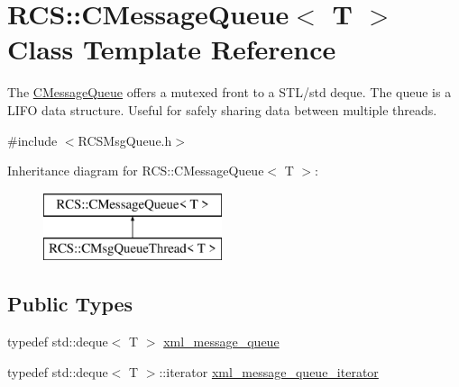 \hypertarget{classRCS_1_1CMessageQueue}{\section{R\-C\-S\-:\-:C\-Message\-Queue$<$ T $>$ Class Template Reference}
\label{classRCS_1_1CMessageQueue}
}


The \hyperlink{classRCS_1_1CMessageQueue}{C\-Message\-Queue} offers a mutexed front to a S\-T\-L/std deque. The queue is a L\-I\-F\-O data structure. Useful for safely sharing data between multiple threads.  




{\ttfamily \#include $<$R\-C\-S\-Msg\-Queue.\-h$>$}

Inheritance diagram for R\-C\-S\-:\-:C\-Message\-Queue$<$ T $>$\-:\begin{figure}[H]
\begin{center}
\leavevmode
\includegraphics[height=2.000000cm]{classRCS_1_1CMessageQueue}
\end{center}
\end{figure}
\subsection*{Public Types}
\begin{DoxyCompactItemize}
\item 
typedef std\-::deque$<$ T $>$ \hyperlink{classRCS_1_1CMessageQueue_a272ec6240c0ae616f66e71a033326e28}{xml\-\_\-message\-\_\-queue}
\item 
typedef std\-::deque$<$ T $>$\-::iterator \hyperlink{classRCS_1_1CMessageQueue_aa229add119e43aa53229252b6dffb691}{xml\-\_\-message\-\_\-queue\-\_\-iterator}
\end{DoxyCompactItemize}
